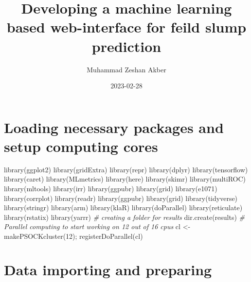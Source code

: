 \documentclass[
]{article}
\title{Developing a machine learning based web-interface for feild slump
prediction}
\author{Muhammad Zeshan Akber}
\date{2023-02-28}
\newenvironment{Shaded}{\begin{snugshade}}{\end{snugshade}}
\newcommand{\CommentTok}[1]{\textcolor[rgb]{0.56,0.35,0.01}{\textit{#1}}}
\newcommand{\DecValTok}[1]{\textcolor[rgb]{0.00,0.00,0.81}{#1}}
\newcommand{\FunctionTok}[1]{\textcolor[rgb]{0.00,0.00,0.00}{#1}}
\newcommand{\NormalTok}[1]{#1}
\newcommand{\OtherTok}[1]{\textcolor[rgb]{0.56,0.35,0.01}{#1}}
\newcommand{\StringTok}[1]{\textcolor[rgb]{0.31,0.60,0.02}{#1}}
\begin{document}
\maketitle

\hypertarget{loading-necessary-packages-and-setup-computing-cores}{%
\section{Loading necessary packages and setup computing
cores}\label{loading-necessary-packages-and-setup-computing-cores}}

\begin{Shaded}
\begin{Highlighting}[]
\FunctionTok{library}\NormalTok{(ggplot2)}
\FunctionTok{library}\NormalTok{(gridExtra)}
\FunctionTok{library}\NormalTok{(repr)}
\FunctionTok{library}\NormalTok{(dplyr)}
\FunctionTok{library}\NormalTok{(tensorflow)}
\FunctionTok{library}\NormalTok{(caret)}
\FunctionTok{library}\NormalTok{(MLmetrics)}
\FunctionTok{library}\NormalTok{(here)}
\FunctionTok{library}\NormalTok{(skimr)}
\FunctionTok{library}\NormalTok{(multiROC)}
\FunctionTok{library}\NormalTok{(mltools)}
\FunctionTok{library}\NormalTok{(irr)}
\FunctionTok{library}\NormalTok{(ggpubr)}
\FunctionTok{library}\NormalTok{(grid)}
\FunctionTok{library}\NormalTok{(e1071)}
\FunctionTok{library}\NormalTok{(corrplot)}
\FunctionTok{library}\NormalTok{(readr)}
\FunctionTok{library}\NormalTok{(ggpubr)}
\FunctionTok{library}\NormalTok{(grid)}
\FunctionTok{library}\NormalTok{(tidyverse)}
\FunctionTok{library}\NormalTok{(stringr)}
\FunctionTok{library}\NormalTok{(arm)}
\FunctionTok{library}\NormalTok{(klaR)}
\FunctionTok{library}\NormalTok{(doParallel)}
\FunctionTok{library}\NormalTok{(reticulate)}
\FunctionTok{library}\NormalTok{(rstatix)}
\FunctionTok{library}\NormalTok{(yarrr)}
\CommentTok{\# creating a folder for results}
\FunctionTok{dir.create}\NormalTok{(}\StringTok{\textquotesingle{}results\textquotesingle{}}\NormalTok{)}
\CommentTok{\# Parallel computing to start working on 12 out of 16 cpus}
\NormalTok{cl }\OtherTok{\textless{}{-}} \FunctionTok{makePSOCKcluster}\NormalTok{(}\DecValTok{12}\NormalTok{); }\FunctionTok{registerDoParallel}\NormalTok{(cl)}
\end{Highlighting}
\end{Shaded}

\hypertarget{data-importing-and-preparing}{%
\section{Data importing and
preparing}\label{data-importing-and-preparing}}
\end{document}

